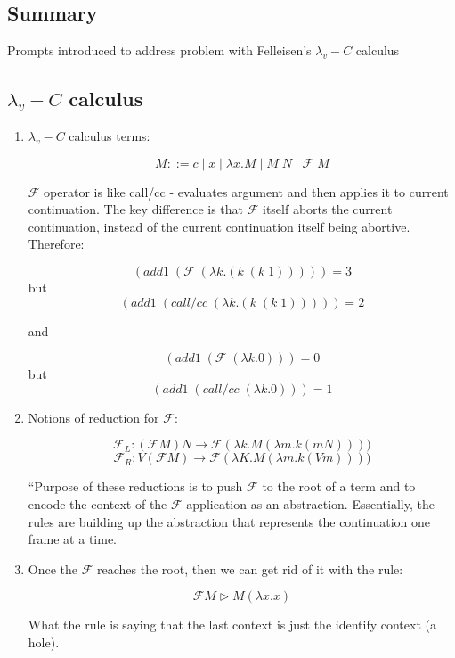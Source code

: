 \documentclass[letterpaper]{llncs}
\newcommand{\F}{ \ensuremath{ \mathcal{F} } }
\newcommand{\lamdavC}{ \ensuremath{ \lambda_v\!\!-\!\!C } }
\newcommand{\app}[2]{ \ensuremath{ #1 \; #2 } }
\newcommand{\appp}[2]{ \ensuremath{ (\app{#1}{#2}) } }
\newcommand{\lam}[2]{ \ensuremath{ \lambda #1.#2 } }
\newcommand{\lamp}[2]{ \ensuremath{ (\lam{#1}{#2}) } }
\begin{document}
\subsection*{Summary}

Prompts introduced to address problem with Felleisen's $\lambda_v\!\!-\!\!C$ calculus~\cite{Felleisen1987SyntacticTheory}
	
\subsection*{$\lamdavC$ calculus}

\begin{enumerate}

	\item $\lambda_v\!\!-\!\!C$ calculus terms:
	
$$M ::= c \mid x \mid \lam{x}{M} \mid \app{M}{N} \mid \app{\F}{M}$$

$\F$ operator is like call/cc - evaluates argument and then applies it to current continuation. The key difference is that $\F$ itself aborts the current continuation, instead of the current continuation itself being abortive. Therefore: 

$$\appp{ add1 }{ \appp{ \F }{ \lamp{k}{ \appp{ k }{ \appp{k}{1} } }}} = 3$$
 but 
$$\appp{ add1 }{ \appp{ call/cc }{ \lamp{k}{ \appp{ k }{ \appp{k}{1} } }}} = 2$$
	
and 

$$\appp{ add1 }{ \appp{ \F }{ \lamp{k}{ 0 }}} = 0$$
 but 
$$\appp{ add1 }{ \appp{ call/cc }{ \lamp{k}{ 0 }}} = 1$$

	\item Notions of reduction for $\F$:
	
	$$\F_L: (\F M) N \rightarrow \F (\lambda k.M (\lambda m.k (m N))))$$
	$$\F_R: V (\F M) \rightarrow \F (\lambda K.M (\lambda m.k (V m))))$$

``Purpose of these reductions is to push $\F$ to the root of a term and to encode the context of the $\F$ application as an abstraction. Essentially, the rules are building up the abstraction that represents the continuation one frame at a time.

	\item

Once the $\F$ reaches the root, then we can get rid of it with the rule:

$$\F M \triangleright M (\lambda x.x)$$

What the rule is saying that the last context is just the identify context (a hole).


\end{enumerate}
\end{document}
